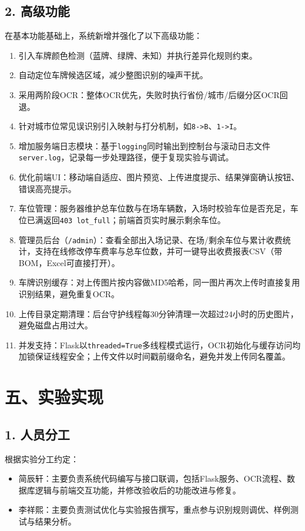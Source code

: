 \documentclass[12pt,a4paper]{article}
\begin{document}
\subsection*{2. 高级功能}
在基本功能基础上，系统新增并强化了以下高级功能：
\begin{enumerate}
  \item 引入车牌颜色检测（蓝牌、绿牌、未知）并执行差异化规则约束。
  \item 自动定位车牌候选区域，减少整图识别的噪声干扰。
  \item 采用两阶段OCR：整体OCR优先，失败时执行省份/城市/后缀分区OCR回退。
  \item 针对城市位常见误识别引入映射与打分机制，如\texttt{8->B}、\texttt{1->I}。
  \item 增加服务端日志模块：基于\texttt{logging}同时输出到控制台与滚动日志文件\texttt{server.log}，记录每一步处理路径，便于复现实验与调试。
  \item 优化前端UI：移动端自适应、图片预览、上传进度提示、结果弹窗确认按钮、错误高亮提示。
  \item 车位管理：服务器维护总车位数与在场车辆数，入场时校验车位是否充足，车位已满返回\texttt{403 lot\_full}；前端首页实时展示剩余车位。
  \item 管理员后台（\texttt{/admin}）：查看全部出入场记录、在场/剩余车位与累计收费统计，支持在线修改停车费率与总车位数，并可一键导出收费报表CSV（带BOM，Excel可直接打开）。
  \item 车牌识别缓存：对上传图片按内容做MD5哈希，同一图片再次上传时直接复用识别结果，避免重复OCR。
  \item 上传目录定期清理：后台守护线程每30分钟清理一次超过24小时的历史图片，避免磁盘占用过大。
  \item 并发支持：Flask以\texttt{threaded=True}多线程模式运行，OCR初始化与缓存访问均加锁保证线程安全；上传文件以时间戳前缀命名，避免并发上传同名覆盖。
\end{enumerate}

\section*{五、实验实现}
\subsection*{1. 人员分工}
根据实验分工约定：
\begin{itemize}
  \item 简辰轩：主要负责系统代码编写与接口联调，包括Flask服务、OCR流程、数据库逻辑与前端交互功能，并修改验收后的功能改进与修复。
  \item 李祥熙：主要负责测试优化与实验报告撰写，重点参与识别规则调优、样例测试与结果分析。
\end{itemize}
\end{document}
